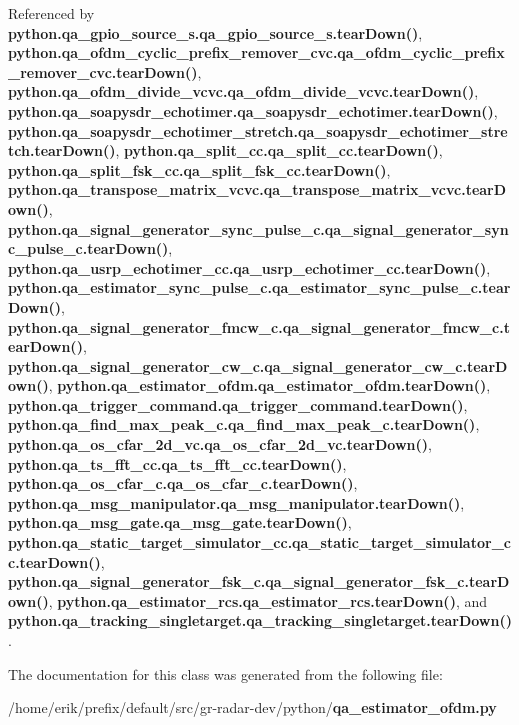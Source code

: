 Referenced by {\bf python.\+qa\+\_\+gpio\+\_\+source\+\_\+s.\+qa\+\_\+gpio\+\_\+source\+\_\+s.\+tear\+Down()}, {\bf python.\+qa\+\_\+ofdm\+\_\+cyclic\+\_\+prefix\+\_\+remover\+\_\+cvc.\+qa\+\_\+ofdm\+\_\+cyclic\+\_\+prefix\+\_\+remover\+\_\+cvc.\+tear\+Down()}, {\bf python.\+qa\+\_\+ofdm\+\_\+divide\+\_\+vcvc.\+qa\+\_\+ofdm\+\_\+divide\+\_\+vcvc.\+tear\+Down()}, {\bf python.\+qa\+\_\+soapysdr\+\_\+echotimer.\+qa\+\_\+soapysdr\+\_\+echotimer.\+tear\+Down()}, {\bf python.\+qa\+\_\+soapysdr\+\_\+echotimer\+\_\+stretch.\+qa\+\_\+soapysdr\+\_\+echotimer\+\_\+stretch.\+tear\+Down()}, {\bf python.\+qa\+\_\+split\+\_\+cc.\+qa\+\_\+split\+\_\+cc.\+tear\+Down()}, {\bf python.\+qa\+\_\+split\+\_\+fsk\+\_\+cc.\+qa\+\_\+split\+\_\+fsk\+\_\+cc.\+tear\+Down()}, {\bf python.\+qa\+\_\+transpose\+\_\+matrix\+\_\+vcvc.\+qa\+\_\+transpose\+\_\+matrix\+\_\+vcvc.\+tear\+Down()}, {\bf python.\+qa\+\_\+signal\+\_\+generator\+\_\+sync\+\_\+pulse\+\_\+c.\+qa\+\_\+signal\+\_\+generator\+\_\+sync\+\_\+pulse\+\_\+c.\+tear\+Down()}, {\bf python.\+qa\+\_\+usrp\+\_\+echotimer\+\_\+cc.\+qa\+\_\+usrp\+\_\+echotimer\+\_\+cc.\+tear\+Down()}, {\bf python.\+qa\+\_\+estimator\+\_\+sync\+\_\+pulse\+\_\+c.\+qa\+\_\+estimator\+\_\+sync\+\_\+pulse\+\_\+c.\+tear\+Down()}, {\bf python.\+qa\+\_\+signal\+\_\+generator\+\_\+fmcw\+\_\+c.\+qa\+\_\+signal\+\_\+generator\+\_\+fmcw\+\_\+c.\+tear\+Down()}, {\bf python.\+qa\+\_\+signal\+\_\+generator\+\_\+cw\+\_\+c.\+qa\+\_\+signal\+\_\+generator\+\_\+cw\+\_\+c.\+tear\+Down()}, {\bf python.\+qa\+\_\+estimator\+\_\+ofdm.\+qa\+\_\+estimator\+\_\+ofdm.\+tear\+Down()}, {\bf python.\+qa\+\_\+trigger\+\_\+command.\+qa\+\_\+trigger\+\_\+command.\+tear\+Down()}, {\bf python.\+qa\+\_\+find\+\_\+max\+\_\+peak\+\_\+c.\+qa\+\_\+find\+\_\+max\+\_\+peak\+\_\+c.\+tear\+Down()}, {\bf python.\+qa\+\_\+os\+\_\+cfar\+\_\+2d\+\_\+vc.\+qa\+\_\+os\+\_\+cfar\+\_\+2d\+\_\+vc.\+tear\+Down()}, {\bf python.\+qa\+\_\+ts\+\_\+fft\+\_\+cc.\+qa\+\_\+ts\+\_\+fft\+\_\+cc.\+tear\+Down()}, {\bf python.\+qa\+\_\+os\+\_\+cfar\+\_\+c.\+qa\+\_\+os\+\_\+cfar\+\_\+c.\+tear\+Down()}, {\bf python.\+qa\+\_\+msg\+\_\+manipulator.\+qa\+\_\+msg\+\_\+manipulator.\+tear\+Down()}, {\bf python.\+qa\+\_\+msg\+\_\+gate.\+qa\+\_\+msg\+\_\+gate.\+tear\+Down()}, {\bf python.\+qa\+\_\+static\+\_\+target\+\_\+simulator\+\_\+cc.\+qa\+\_\+static\+\_\+target\+\_\+simulator\+\_\+cc.\+tear\+Down()}, {\bf python.\+qa\+\_\+signal\+\_\+generator\+\_\+fsk\+\_\+c.\+qa\+\_\+signal\+\_\+generator\+\_\+fsk\+\_\+c.\+tear\+Down()}, {\bf python.\+qa\+\_\+estimator\+\_\+rcs.\+qa\+\_\+estimator\+\_\+rcs.\+tear\+Down()}, and {\bf python.\+qa\+\_\+tracking\+\_\+singletarget.\+qa\+\_\+tracking\+\_\+singletarget.\+tear\+Down()}.



The documentation for this class was generated from the following file\+:\begin{DoxyCompactItemize}
\item 
/home/erik/prefix/default/src/gr-\/radar-\/dev/python/{\bf qa\+\_\+estimator\+\_\+ofdm.\+py}\end{DoxyCompactItemize}
